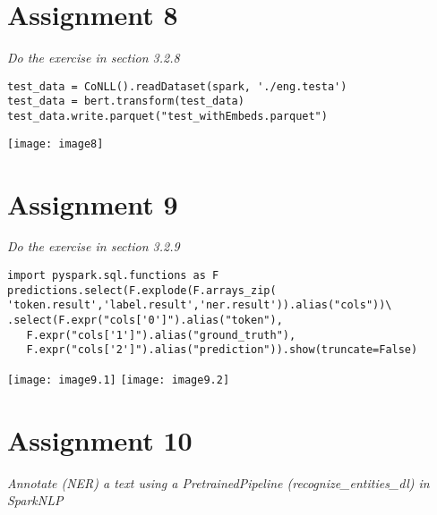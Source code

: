 \documentclass[]{article}
\begin{document}
\section*{Assignment 8}
\emph{ Do the exercise in section 3.2.8 }

\begin{verbatim}
test_data = CoNLL().readDataset(spark, './eng.testa')
test_data = bert.transform(test_data)
test_data.write.parquet("test_withEmbeds.parquet")
\end{verbatim}
\texttt{[image: image8]} %


\section*{Assignment 9}
\emph{ Do the exercise in section 3.2.9 }

\begin{verbatim}
import pyspark.sql.functions as F 
predictions.select(F.explode(F.arrays_zip( 'token.result','label.result','ner.result')).alias("cols"))\
.select(F.expr("cols['0']").alias("token"),
   F.expr("cols['1']").alias("ground_truth"),
   F.expr("cols['2']").alias("prediction")).show(truncate=False)
\end{verbatim}
\texttt{[image: image9.1]} %
\texttt{[image: image9.2]} %

\section*{Assignment 10}
\emph{ Annotate (NER) a text using a PretrainedPipeline (recognize\_entities\_dl) in SparkNLP }
\end{document}
